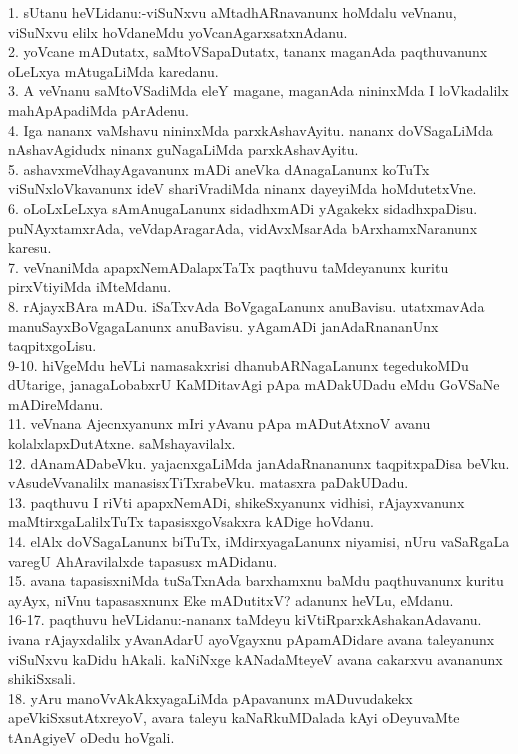 \documentclass{article}
\begin{document}
1. sUtanu heVLidanu:-viSuNxvu aMtadhARnavanunx hoMdalu veVnanu, viSuNxvu elilx hoVdaneMdu yoVcanAgarxsatxnAdanu.\\
2. yoVcane mADutatx, saMtoVSapaDutatx, tananx maganAda paqthuvanunx oLeLxya mAtugaLiMda karedanu.\\
3. A veVnanu saMtoVSadiMda eleY magane, maganAda nininxMda I loVkadalilx mahApApadiMda pArAdenu.\\
4. Iga nananx vaMshavu nininxMda parxkAshavAyitu. nananx doVSagaLiMda nAshavAgidudx ninanx guNagaLiMda parxkAshavAyitu.\\
5. ashavxmeVdhayAgavanunx mADi aneVka dAnagaLanunx koTuTx viSuNxloVkavanunx ideV shariVradiMda ninanx dayeyiMda hoMdutetxVne.\\
6. oLoLxLeLxya sAmAnugaLanunx sidadhxmADi yAgakekx sidadhxpaDisu. puNAyxtamxrAda, veVdapAragarAda, vidAvxMsarAda bArxhamxNaranunx karesu.\\
7. veVnaniMda apapxNemADalapxTaTx paqthuvu taMdeyanunx kuritu pirxVtiyiMda iMteMdanu.\\
8. rAjayxBAra mADu. iSaTxvAda BoVgagaLanunx anuBavisu. utatxmavAda manuSayxBoVgagaLanunx anuBavisu. yAgamADi janAdaRnananUnx taqpitxgoLisu.\\
9-10. hiVgeMdu heVLi namasakxrisi dhanubARNagaLanunx tegedukoMDu dUtarige, janagaLobabxrU KaMDitavAgi pApa mADakUDadu eMdu GoVSaNe mADireMdanu.\\
11. veVnana Ajecnxyanunx mIri yAvanu pApa mADutAtxnoV avanu kolalxlapxDutAtxne. saMshayavilalx.\\
12. dAnamADabeVku. yajacnxgaLiMda janAdaRnananunx taqpitxpaDisa beVku. vAsudeVvanalilx manasisxTiTxrabeVku. matasxra paDakUDadu.\\
13. paqthuvu I riVti apapxNemADi, shikeSxyanunx vidhisi, rAjayxvanunx maMtirxgaLalilxTuTx tapasisxgoVsakxra kADige hoVdanu.\\
14. elAlx doVSagaLanunx biTuTx, iMdirxyagaLanunx niyamisi, nUru vaSaRgaLa varegU AhAravilalxde tapasusx mADidanu.\\
15. avana tapasisxniMda tuSaTxnAda barxhamxnu baMdu paqthuvanunx kuritu ayAyx, niVnu tapasasxnunx Eke mADutitxV? adanunx heVLu, eMdanu.\\
16-17. paqthuvu heVLidanu:-nananx taMdeyu kiVtiRparxkAshakanAdavanu. ivana rAjayxdalilx yAvanAdarU ayoVgayxnu pApamADidare avana taleyanunx viSuNxvu kaDidu hAkali. kaNiNxge kANadaMteyeV avana cakarxvu avananunx shikiSxsali.\\
18. yAru manoVvAkAkxyagaLiMda pApavanunx mADuvudakekx apeVkiSxsutAtxreyoV, avara taleyu kaNaRkuMDalada kAyi oDeyuvaMte tAnAgiyeV oDedu hoVgali.\\
\end{document}

